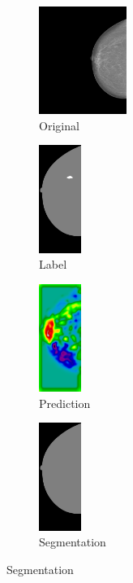 \documentclass{beamer}
\begin{document}
\begin{frame}
\begin{figure}[h]
\begin{subfigure}{0.25\textwidth}
				\centering
					\includegraphics[height = 3.5cm]{plots/mammogram_ex2.png}
				\caption{Original}
			\end{subfigure}
			\begin{subfigure}{0.16\textwidth}
				\centering
					\includegraphics[height = 3.5cm]{plots/label_ex2.png}
				\caption{Label}
			\end{subfigure}
			\begin{subfigure}{0.17\textwidth}
				\centering
					\includegraphics[height = 3.5cm]{plots/logits_ex2_v2.png}
				\caption{Prediction}
			\end{subfigure}
			\begin{subfigure}{0.22\textwidth}
				\centering
					\includegraphics[height = 3.5cm]{plots/segmentation_ex2_v2.png}
				\caption{Segmentation}
			\end{subfigure}%
		\end{figure}		
	\end{frame}
	
\end{document}
